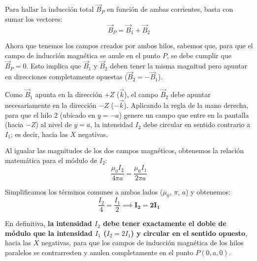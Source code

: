 \documentclass[11pt, a4paper]{article}
\newenvironment{problem}[1][Cuestión]{
	\vspace{0.5cm}
	\noindent{\Large\bfseries #1} \par\vspace{0.5cm}
}{
	\vspace{0.5cm}
}
\begin{document}
\begin{problem}[Cuestión 2]
\begin{enumerate}[label=\alph*)]
{					Para hallar la inducción total $\vec{B}_P$ en función de ambas corrientes, basta con sumar los vectores:
					\begin{equation*}
						\vec{B}_P = \vec{B}_1 + \vec{B}_2
					\end{equation*}

					\vspace{0.5cm}

					Ahora que tenemos los campos creados por ambos hilos, sabemos que, para que el campo de inducción magnética se anule en el punto $P$, se debe cumplir que $\vec{B}_P = 0$. Esto implica que $\vec{B}_1$ y $\vec{B}_2$ deben tener la misma magnitud pero apuntar en direcciones completamente opuestas ($\vec{B}_2 = - \vec{B}_1$).

					Como $\vec{B}_1$ apunta en la dirección $+Z$ ($\vec{k}$), el campo $\vec{B}_2$ debe apuntar necesariamente en la dirección $-Z$ ($-\vec{k}$). Aplicando la regla de la mano derecha, para que el hilo 2 (ubicado en $y=-a$) genere un campo que entre en la pantalla (hacia $-Z$) al nivel de $y=a$, la intensidad $I_2$ debe circular en sentido contrario a $I_1$; es decir, hacia las $X$ negativas.

					Al igualar las magnitudes de los dos campos magnéticos, obtenemos la relación matemática para el módulo de $I_2$:
					\begin{equation*}
						\frac{\mu_0 I_2}{4\pi a} = \frac{\mu_0 I_1}{2\pi a}
					\end{equation*}

					Simplificamos los términos comunes a ambos lados ($\mu_0$, $\pi$, $a$) y obtenemos:
					\begin{equation*}
						\frac{I_2}{4} = \frac{I_1}{2} \implies \mathbf{I_2 = 2 I_1}
					\end{equation*}

					En definitiva, \textbf{la intensidad $I_2$ debe tener exactamente el doble de módulo que la intensidad $I_1$ ($I_2 = 2I_1$) y circular en el sentido opuesto}, hacia las $X$ negativas, para que los campos de inducción magnética de los hilos paralelos se contrarresten y anulen completamente en el punto $P(0,a,0)$.
				}
		\end{enumerate}
	\end{problem}
\end{document}
